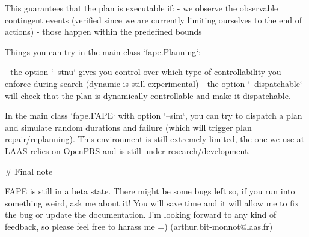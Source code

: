 This guarantees that the plan is executable if:
 - we observe the observable contingent events (verified since we are currently 
limiting ourselves to the end of actions)
 - those happen within the predefined bounds

Things you can try in the main class `fape.Planning`:

 - the option `--stnu` gives you control over which type of controllability you 
enforce during search (dynamic is still experimental)
 - the option `--dispatchable` will check that the plan is dynamically 
controllable and make it dispatchable.

In the main class `fape.FAPE` with option `--sim`, you can try to dispatch a plan 
and simulate random durations and failure (which will trigger plan 
repair/replanning). This environment is still extremely limited, the one we 
use at LAAS relies on OpenPRS and is still under research/development.

# Final note

FAPE is still in a beta state. There might be some bugs left so, if you run into something weird, ask me about it! You will save time and it will allow me to fix the bug or update the documentation.
I'm looking forward to any kind of feedback, so please feel free to harass me =) (arthur.bit-monnot@laas.fr)
